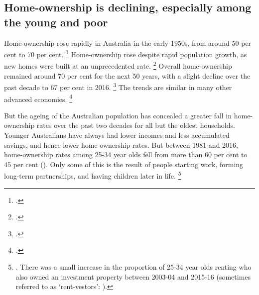 \subsection{Home-ownership is declining, especially among the young and poor}\label{subsec:home-ownership-is-declining-especially-among-the-young-and-poor}

Home-ownership rose rapidly in Australia in the early 1950s, from around 50 per cent to 70 per cent.%
	\footcite[][2--3]{RBA2015SubmissionHomeOwnershipInquiry}
Home-ownership rose despite rapid population growth, as new homes were built at an unprecedented rate.%
	\footcite[][4]{Eslake-AIST}
Overall home-ownership remained around 70 per cent for the next 50 years, with a slight decline over the past decade to 67 per cent in 2016.%
	\footcite{ABS20016Censuspopulationhousing}
The trends are similar in many other advanced economies.%
	\footcite[][3]{RBA2015SubmissionHomeOwnershipInquiry}

But the ageing of the Australian population has concealed a greater fall in home-ownership rates over the past two decades for all but the oldest households.
Younger Australians have always had lower incomes and less accumulated savings, and hence lower home-ownership rates.
But between 1981 and 2016, home-ownership rates among 25-34 year olds fell from more than 60 per cent to 45 per cent ().
Only some of this is the result of people starting work, forming long-term partnerships, and having children later in life.%
    \footnote{\textcite{Wood-Ong-2012}.
    There was a small increase in the proportion of 25-34 year olds renting who also owned an investment property between 2003-04 and 2015-16 (sometimes referred to as `rent-vestors': \textcite{Millar2016_rentvestors}).}


